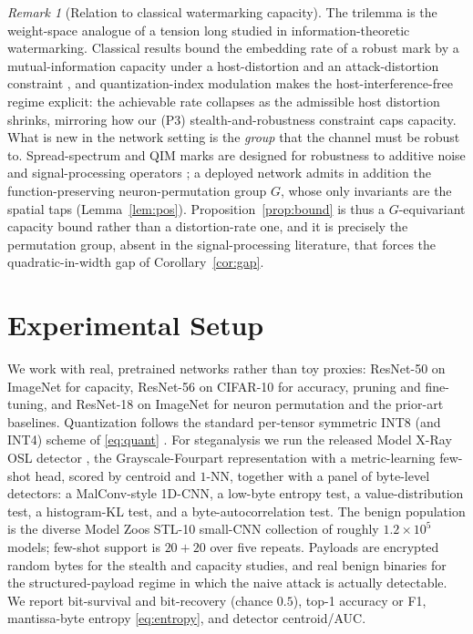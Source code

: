 \documentclass[a4paper,fleqn]{cas-dc}
\theoremstyle{plain}
\theoremstyle{remark}
\newtheorem{remark}{Remark}
\begin{document}
\begin{remark}[Relation to classical watermarking capacity]\label{rem:classical}
The trilemma is the weight-space analogue of a tension long studied in
information-theoretic watermarking. Classical results bound the embedding rate of a
robust mark by a mutual-information capacity under a host-distortion and an
attack-distortion constraint \cite{moulin2003watermarking}, and quantization-index
modulation \cite{chen2001qim} makes the host-interference-free regime explicit: the
achievable rate collapses as the admissible host distortion shrinks, mirroring how our
(P3) stealth-and-robustness constraint caps capacity. What is new in the network setting
is the \emph{group} that the channel must be robust to. Spread-spectrum and QIM marks are
designed for robustness to additive noise and signal-processing operators
\cite{cox1997spread,chen2001qim}; a deployed network admits in addition the
function-preserving neuron-permutation group $G$, whose only invariants are the spatial
taps (Lemma~\ref{lem:pos}). Proposition~\ref{prop:bound} is thus a $G$-equivariant
capacity bound rather than a distortion-rate one, and it is precisely the permutation
group, absent in the signal-processing literature, that forces the quadratic-in-width gap
of Corollary~\ref{cor:gap}.
\end{remark}

\section{Experimental Setup}\label{sec:setup}
We work with real, pretrained networks rather than toy proxies: ResNet-50
\cite{he2016resnet} on ImageNet \cite{deng2009imagenet} for capacity, ResNet-56 on
CIFAR-10 \cite{krizhevsky2009cifar} for accuracy, pruning and fine-tuning, and
ResNet-18 on ImageNet for neuron permutation and the prior-art baselines. Quantization
follows the standard per-tensor symmetric INT8 (and INT4) scheme of \eqref{eq:quant}
\cite{nagel2021whitepaper}.
For steganalysis we run the released Model X-Ray OSL detector
\cite{gilkarov2026modelxray}, the Grayscale-Fourpart representation with a
metric-learning few-shot head, scored by centroid and $1$-NN, together with a panel
of byte-level detectors: a MalConv-style 1D-CNN, a low-byte entropy test, a
value-distribution test, a histogram-KL test, and a byte-autocorrelation test. The
benign population is the diverse Model Zoos STL-10 small-CNN collection
\cite{schurholt2022modelzoos} of roughly $1.2\times10^{5}$ models; few-shot support is
$20{+}20$ over five repeats. Payloads are encrypted random
bytes for the stealth and capacity studies, and real benign binaries for the
structured-payload regime in which the naive attack is actually detectable. We report
bit-survival and bit-recovery (chance $0.5$), top-1 accuracy or F1, mantissa-byte
entropy \eqref{eq:entropy}, and detector centroid/AUC.
\end{document}
